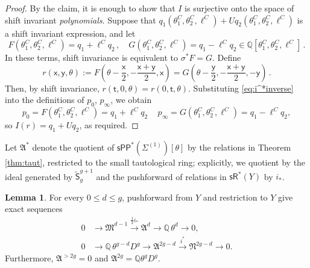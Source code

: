 \documentclass[11pt]{article}
\def\QQ{\mathbb{Q}}
\def\sR{\mathsf{sR}}
\newcommand{\sfS}{\mathsf{S}}
\newcommand{\sh}{\sigma}
\newcommand{\sPP}{\mathsf{sPP}}
\newcommand{\spp}{\sPP}
\theoremstyle{definition}
\newtheorem{lemma}[definition]{Lemma}
\begin{document}
\begin{proof}
    By the claim, it is enough to show that $I$ is surjective onto the space of shift invariant \emph{polynomials}. Suppose that $q_1(\theta_1^C, \theta_2^C, \ell^C) + U q_2(\theta_1^C, \theta_2^C, \ell^C)$ is a shift invariant expression, and let
    $$
    F(\theta_1^C, \theta_2^C,\ell^C) = q_1 +\ell^C q_2\, , \quad G(\theta_1^C, \theta_2^C,\ell^C) = q_1 - \ell^Cq_2 \in \QQ[\theta_1^C, \theta_2^C, \ell^C]\,.
    $$
    In these terms, shift invariance is equivalent to $\sh^*F=G$. Define
    \begin{equation}\label{eq:i^*inverse}
        r(\mathsf{x}, \mathsf{y},\theta) :=F\left(\theta-\frac{\mathsf{x}}{2}, -\frac{\mathsf{x}+\mathsf{y}}{2},\mathsf{x}\right)=G\left(\theta-\frac{\mathsf{y}}{2},-\frac{\mathsf{x}+\mathsf{y}}{2}, -\mathsf{y}\right)\,.
    \end{equation}
    Then, by shift invariance, $r(\mathsf{t},0,\theta) = r(0,\mathsf{t},\theta)$. Substituting \eqref{eq:i^*inverse} into the definitions of $p_0$, $p_\infty$, we obtain
    $$
    p_0=F(\theta_1^C,\theta_2^C,\ell^C)=q_1+\ell^Cq_2\, \quad p_\infty = G(\theta_1^C,\theta_2^C,\ell^C)=q_1 -\ell^Cq_2,
    $$
    so $I(r)=q_1 +Uq_2$, as required.
   \end{proof}

Let $\mathfrak A^*$ denote the quotient of
$\spp^*(\Sigma^{(1)})[\theta]$ by the relations in Theorem
\ref{thm:taut}, restricted to the small tautological ring; explicitly, we quotient by the ideal generated by $\widetilde{\sfS}_{g}^{g+1}$ and the pushforward of relations in $\sR^*(Y)$ by $i_*$.

\begin{lemma}\label{lem:two-exact-sequences}
For every $0\leq d\leq g$, pushforward from $Y$ and restriction to $Y$
give exact sequences
\begin{align}
 0&\longrightarrow \mathfrak M^{d-1}
 \stackrel{\frac12i_*}{\longrightarrow} \mathfrak A^d
 \longrightarrow \QQ\,\theta^d
 \longrightarrow0,\label{eq:low-exact}\\
 0&\longrightarrow
 \QQ\,\theta^{g-d}D^g
 \longrightarrow \mathfrak A^{2g-d}
 \xrightarrow{\ i^*\ }\mathfrak N^{2g-d}
 \longrightarrow0.\label{eq:high-exact}
\end{align}
Furthermore, $\mathfrak A^{>2g}=0$ and
$\mathfrak A^{2g}=\QQ\theta^gD^g$.
\end{lemma}
\end{document}
